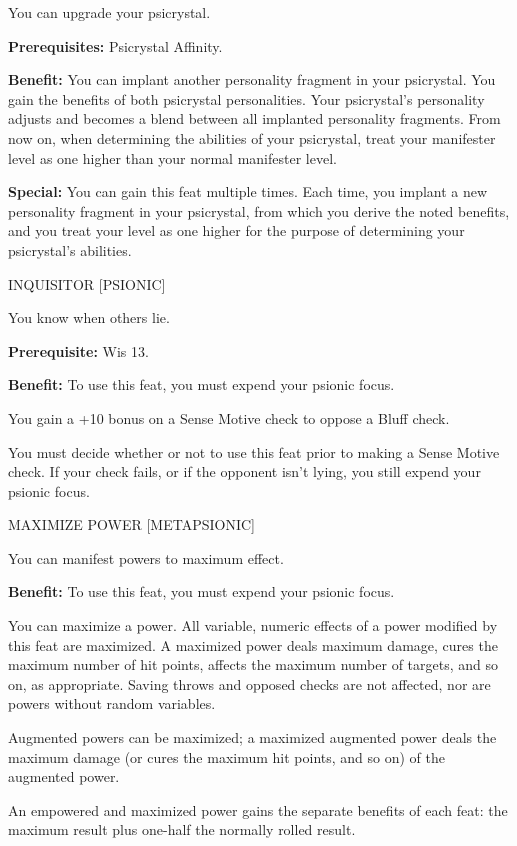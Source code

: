 \documentclass{article}
\begin{document}
You can upgrade your psicrystal.

\textbf{Prerequisites:} Psicrystal Affinity.

\textbf{Benefit:} You can implant another personality fragment in your psicrystal. 
You gain the benefits of both psicrystal personalities. Your psicrystal's personality 
adjusts and becomes a blend between all implanted personality fragments. From now 
on, when determining the abilities of your psicrystal, treat your manifester level 
as one higher than your normal manifester level.

\textbf{Special:} You can gain this feat multiple times. Each time, you implant 
a new personality fragment in your psicrystal, from which you derive the noted 
benefits, and you treat your level as one higher for the purpose of determining 
your psicrystal's abilities.

\vspace{12pt}
INQUISITOR [PSIONIC] 

You know when others lie.

\textbf{Prerequisite:} Wis 13.

\textbf{Benefit:} To use this feat, you must expend your psionic focus.

You gain a +10 bonus on a Sense Motive check to oppose a Bluff check.

You must decide whether or not to use this feat prior to making a Sense Motive 
check. If your check fails, or if the opponent isn't lying, you still expend your 
psionic focus. 

\vspace{12pt}
MAXIMIZE POWER [METAPSIONIC]

You can manifest powers to maximum effect.

\textbf{Benefit:} To use this feat, you must expend your psionic focus.

You can maximize a power. All variable, numeric effects of a power modified by 
this feat are maximized. A maximized power deals maximum damage, cures the maximum 
number of hit points, affects the maximum number of targets, and so on, as appropriate. 
Saving throws and opposed checks are not affected, nor are powers without random 
variables.

Augmented powers can be maximized; a maximized augmented power deals the maximum 
damage (or cures the maximum hit points, and so on) of the augmented power.

An empowered and maximized power gains the separate benefits of each feat: the 
maximum result plus one-half the normally rolled result.
\end{document}
